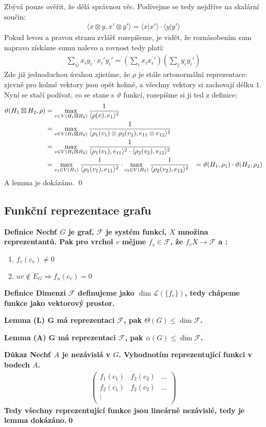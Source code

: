 \documentclass[a4paper,12pt,titlepage]{article}
\newcommand{\shn}{\Theta}
\newcommand{\lm}{\smallskip\noindent\bf Lemma\rm{} }
\newcommand{\dk}{\smallskip\noindent\bf Důkaz\rm{} }
\newcommand{\df}{\smallskip\noindent\bf Definice\rm{} }
\newcommand{\F}{\mathcal{F}}
\renewcommand{\L}{\mathcal{L}}
\renewcommand{\L}{\mathcal{L}}
\newcommand{\sk}[1]{\langle #1\rangle}
\begin{document}
Zbývá pouze ověřit, že dělá správnou věc. Podívejme se tedy nejdříve na skalární 
součin:
\begin{align}
	\sk{x \otimes y , x' \otimes y'} = \sk{x | x'} \cdot \sk{y | y'}
\end{align}
Pokud levou a pravou stranu zvlášť rozepíšeme, je vidět, že roznásobením sum 
napravo získáme sumu nalevo a rovnost tedy platí:
\begin{align}
	\sum_{ij} x_iy_i \cdot x_i' y_i' = \left( \sum_i x_ix_i'\right) \left(\sum_j 
	y_iy_i' \right)
\end{align}
Zde již jednoduchou úvahou zjistíme, že $\rho$ je stále ortonormální 
reprezentace: zjevně pro kolmé vektory jsou opět kolmé, a všechny vektory si 
zachovají délku $1$. Nyní se stačí podívat, co se stane s $\vartheta$ funkcí, 
rozepišme si ji ted z definice:
\begin{align*}
	\vartheta(H_1 \boxtimes H_2, \rho) &= \max_{v\in V(H_1 \boxtimes H_2)} { 1 
	\over \sk{\rho(v) , e_1}^2} \\
	&= \max_{v\in V(H_1 \boxtimes H_2)} { 1 \over \sk{\rho_1(v_1)\otimes \rho_2(v_2) , e_{11} \otimes e_{12}}^2} \\
	&= \max_{v\in V(H_1 \boxtimes H_2)} { 1 \over \sk{\rho_1(v_1) , e_{11}}^2
		\cdot \sk{\rho_2(v_2) , e_{12}}^2} \\
	&= \max_{v_1\in V(H_1)} { 1 \over \sk{\rho_1(v_1) , e_{11}}^2} \cdot
	  \max_{v_2\in V(H_2)} { 1 \over \sk{\rho_2(v_2) , e_{12}}^2} 
	&= \vartheta(H_1,\rho_1) \cdot \vartheta(H_2, \rho_2)
\end{align*}
A lemma je dokázáno. \qed


\subsection{Funkční reprezentace grafu}
\df Nechť $G$ je graf, $\F$ je systém funkcí, $X$ množina reprezentantů. Pak pro vrchol $v$ mějme $f_v \in \F$, že $f_v X \to \F$ a :
\begin{enumerate}
	\item $f_v(c_v) \neq 0$
	\item $uv \notin E_G \Rightarrow f_u(c_v) = 0$
\end{enumerate}

\df Dimenzi $\F$ definujeme jako $\dim\L(\{f_v\})$, tedy chápeme funkce jako vektorový prostor.


\lm(L) G má reprezentaci $\F$, pak $\shn(G) \leq \dim \F$.

\lm(A) G má reprezentaci $\F$, pak $\alpha(G) \leq \dim \F$.\par
\dk Nechť $A$ je nezávislá v $G$. Vyhodnotím reprezentující funkci v bodech $A$.
\begin{align}
\left(
	\begin{matrix}
		f_1(c_1) & f_2(c_2) & \dots \\
		f_2(c_1) & f_2(c_2) & \dots \\
		\vdots &&\\
	\end{matrix}\right)
\end{align}
Tedy všechny reprezentující funkce jsou lineárně nezávislé, tedy je lemma dokázáno.\qed
\end{document}

